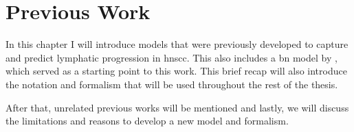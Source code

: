 \documentclass[\relativeRoot/main.tex]{subfiles}
\begin{document}
\chapter{Previous Work}
\label{chap:previous_work}

In this chapter I will introduce models that were previously developed to capture and predict lymphatic progression in \gls{hnscc}. This also includes a \gls{bn} model by \cite{pouymayou_bayesian_2019}, which served as a starting point to this work. This brief recap will also introduce the notation and formalism that will be used throughout the rest of the thesis.

After that, unrelated previous works will be mentioned and lastly, we will discuss the limitations and reasons to develop a new model and formalism.



\end{document}
